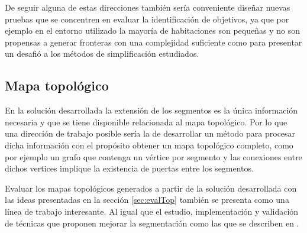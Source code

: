 
De seguir alguna de estas direcciones también sería conveniente diseñar nuevas
pruebas que se concentren en evaluar la identificación de objetivos, ya que por
ejemplo en el entorno utilizado la mayoría de habitaciones son pequeñas y no son
propensas a generar fronteras con una complejidad suficiente como para
presentar un desafió a los métodos de simplificación estudiados.







\subsection{Mapa topológico}

En la solución desarrollada la extensión de los segmentos es la única
información necesaria y que se tiene disponible relacionada al mapa topológico.
Por lo que una dirección de trabajo posible sería la de desarrollar un método
para procesar dicha información con el propósito obtener un mapa topológico
completo, como por ejemplo un grafo que contenga un vértice por segmento y las
conexiones entre dichos vertices implique la existencia de puertas entre los segmentos.

Evaluar los mapas topológicos generados a partir de la solución desarrollada
con las ideas presentadas en la sección \ref{sec:evalTop} también se presenta
como una línea de trabajo interesante. Al igual que el estudio, implementación
y validación de técnicas que proponen mejorar la segmentación como las que se
describen en \cite{Thrun1998,Liu2015,wurm2008coordinated}.

